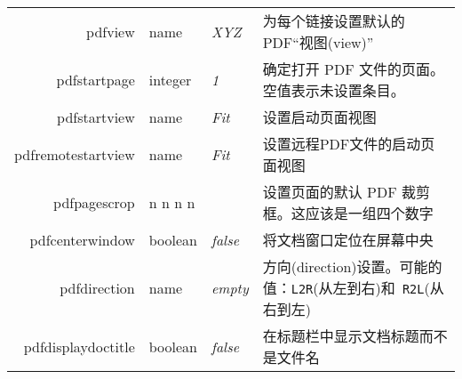 \documentclass{article}
\begin{document}
\begin{longtable}{@{}>{\ttfamily}r>{\raggedright}p{}>{\itshape}lp{7cm}@{}}
  pdfview             & name           & XYZ                       & 为每个链接设置默认的 PDF“视图(view)”                                                                                                                                                                                                     \\
  pdfstartpage        & integer        & 1                         & 确定打开 PDF 文件的页面。空值表示未设置条目。                                                                                                                                                                                                    \\
  pdfstartview        & name           & Fit                       & 设置启动页面视图                                                                                                                                                                                                                     \\
  pdfremotestartview  & name           & Fit                       & 设置远程PDF文件的启动页面视图                                                                                                                                                                                                             \\
  pdfpagescrop        & n n n n        &                           & 设置页面的默认 PDF 裁剪框。这应该是一组四个数字                                                                                                                                                                                                   \\
  pdfcenterwindow     & boolean        & false                     & 将文档窗口定位在屏幕中央                                                                                                                                                                                                                 \\
  pdfdirection        & name           & empty                     & 方向(direction)设置。可能的值：\verb|L2R|(从左到右)和\verb| R2L|(从右到左)                                                                                                                                                                      \\
  pdfdisplaydoctitle  & boolean        & false                     & 在标题栏中显示文档标题而不是文件名                                                                                                                                                                                                            \\

\end{longtable}
\end{document}

